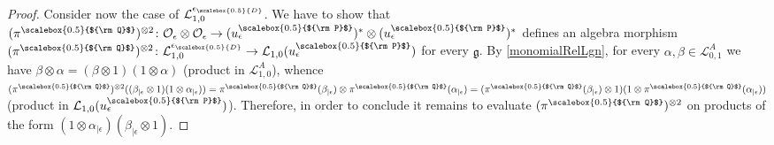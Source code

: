 \documentclass[11pt]{amsart}
\newcommand{\e}{\epsilon}
\newcommand{\Ll}{\mathcal{L}}
\newcommand{\Oo}{\mathcal{O}}
\newcommand{\eD}{\epsilon_{\scalebox{0.5}{D}}}
\newcommand{\Q}{{\scalebox{0.5}{${\rm Q}$}}}
\newcommand{\Pup}{{\scalebox{0.5}{${\rm P}$}}}
\begin{document}
\begin{proof}
Consider now the case of $\Ll_{1,0}^{\eD}$. We have to show that $(\pi^\Q)^{\otimes 2}\colon \Oo_\e \otimes \Oo_\e \to (u_\e^\Pup)^*\otimes (u_\e^\Pup)^*$ defines an algebra morphism $(\pi^\Q)^{\otimes 2}\colon \Ll_{1,0}^{\eD}\to \Ll_{1,0}(u_\e^\Pup)$ for every $\mathfrak{g}$. By \eqref{monomialRelLgn}, for every $\alpha,\beta \in \mathcal{L}_{0,1}^A$ we have $ \beta \otimes \alpha = (\beta\otimes 1)(1\otimes \alpha)$  (product in $\Ll_{1,0}^A$), whence $(\pi^\Q)^{\otimes 2}((\beta_{|\e}\otimes 1)(1\otimes \alpha_{|\e})) = \pi^\Q(\beta_{|\e}) \otimes \pi^\Q(\alpha_{|\e}) = (\pi^\Q(\beta_{|\e})\otimes 1)(1\otimes \pi^\Q(\alpha_{|\e}))$ (product in $\Ll_{1,0}(u_\e^\Pup)$). Therefore, in order to conclude it remains to evaluate $(\pi^\Q)^{\otimes 2}$ on products of the form $(1\otimes \alpha_{|\e})(\beta_{|\e}\otimes 1)$. 


\end{proof}
\end{document}
